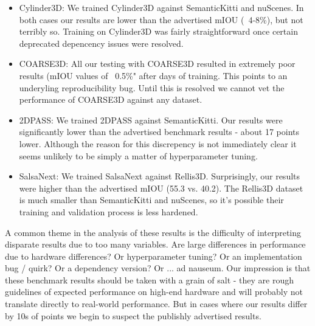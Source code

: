 \begin{itemize}
  \item Cylinder3D: We trained Cylinder3D against SemanticKitti and nuScenes. In both cases our results are lower than the advertised mIOU (~4-8\%), but not terribly so. Training on Cylinder3D was fairly straightforward once certain deprecated depencency issues were resolved.
  \item COARSE3D: All our testing with COARSE3D resulted in extremely poor results (mIOU values of ~0.5\%" after days of training. This points to an underyling reproducibility bug. Until this is resolved we cannot vet the performance of COARSE3D against any dataset.
  \item 2DPASS: We trained 2DPASS against SemanticKitti. Our results were significantly lower than the advertised benchmark results - about 17 points lower. Although the reason for this discrepency is not immediately clear it seems unlikely to be simply a matter of hyperparameter tuning.
  \item SalsaNext: We trained SalsaNext against Rellis3D. Surprisingly, our results were higher than the advertised mIOU (55.3 vs. 40.2). The Rellis3D dataset is much smaller than SemanticKitti and nuScenes, so it's possible their training and validation process is less hardened.
\end{itemize}

A common theme in the analysis of these results is the difficulty of interpreting disparate results due to too many variables. Are large differences in performance due to hardware differences? Or hyperparameter tuning? Or an implementation bug / quirk? Or a dependency version? Or ... ad nauseum. Our impression is that these benchmark results should be taken with a grain of salt - they are rough guidelines of expected performance on high-end hardware and will probably not translate directly to real-world performance. But in cases where our results differ by 10s of points we begin to suspect the publishly advertised results.

